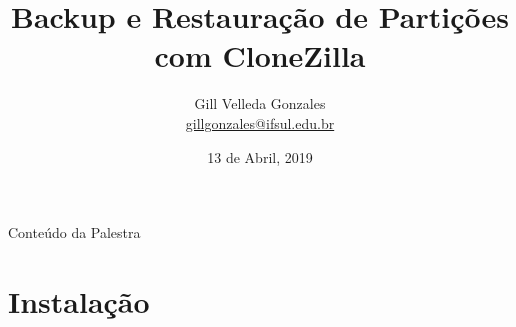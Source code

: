 \documentclass{beamer}
\title[Backup e Restauração de Partições com CloneZilla]{
 Backup e Restauração de Partições com CloneZilla}
\author[\href{https://github.com/g1ll}{Gill Velleda Gonzales}]{
  Gill Velleda Gonzales\\
  \medskip
  {\small {\href{mailto:gillgonzales@ifsul.edu.br}{gillgonzales@ifsul.edu.br}}
  }}
\institute[TCHELINUX LIVRAMENTO 2019]{
 IFSUL - Campus Sant'ana do Livramento\\
  }
\date{13 de Abril, 2019}
\begin{document}

\begin{frame}
  \titlepage
\end{frame}

\begin{frame}{Conteúdo da Palestra}
    \begin{multicols}{2}
    \tableofcontents
    \end{multicols}
\end{frame}

\section{Instalação}
\end{document}
